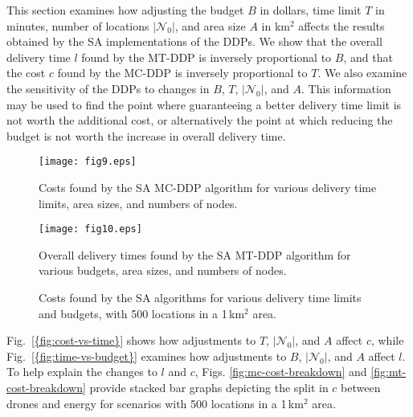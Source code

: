 \documentclass[journal]{IEEEtran}
\begin{document}
This section examines how adjusting the budget ${\ensuremath{B}}$ in dollars, time limit ${\ensuremath{T}}$ in minutes, number of locations $|{\ensuremath{{\ensuremath{\mathcal{N}}}_{0}}}{}|$, and area size ${\ensuremath{A}}$ in km$^2$ affects the results obtained by the SA implementations of the DDPs. We show that the overall delivery time ${\ensuremath{l}}$ found by the MT-DDP is inversely proportional to ${\ensuremath{B}}$, and that the cost ${\ensuremath{c}}$ found by the MC-DDP is inversely proportional to ${\ensuremath{T}}$. We also examine the sensitivity of the DDPs to changes in ${\ensuremath{B}}$, ${\ensuremath{T}}$, $|{\ensuremath{{\ensuremath{\mathcal{N}}}_{0}}}{}|$, and ${\ensuremath{A}}$. This information may be used to find the point where guaranteeing a better delivery time limit is not worth the additional cost, or alternatively the point at which reducing the budget is not worth the increase in overall delivery time.

\begin{figure}[t!]
\centering
\texttt{[image: fig9.eps]}
\caption{Costs found by the SA MC-DDP algorithm for various delivery time limits, area sizes, and numbers of nodes.}
\label{fig:cost-vs-time}
\end{figure}

\begin{figure}[t!]
\centering
\texttt{[image: fig10.eps]}
\caption{Overall delivery times found by the SA MT-DDP algorithm for various budgets, area sizes, and numbers of nodes.}
\label{fig:time-vs-budget}
\end{figure}

\begin{figure}[t!]
\centering
{}
\caption{Costs found by the SA algorithms for various delivery time limits and budgets, with 500 locations in a 1\,km$^2$ area.}
\label{fig:cost-breakdown}
\end{figure}

{Fig.~\ref{{fig:cost-vs-time}}} shows how adjustments to ${\ensuremath{T}}$, $|{\ensuremath{{\ensuremath{\mathcal{N}}}_{0}}}{}|$, and ${\ensuremath{A}}$ affect ${\ensuremath{c}}$, while {Fig.~\ref{{fig:time-vs-budget}}} examines how adjustments to ${\ensuremath{B}}$, $|{\ensuremath{{\ensuremath{\mathcal{N}}}_{0}}}{}|$, and ${\ensuremath{A}}$ affect ${\ensuremath{l}}$. To help explain the changes to ${\ensuremath{l}}$ and ${\ensuremath{c}}$, Figs. \ref{fig:mc-cost-breakdown} and \ref{fig:mt-cost-breakdown} provide stacked bar graphs depicting the split in ${\ensuremath{c}}$ between drones and energy for scenarios with 500 locations in a 1\,km$^2$ area.
\end{document}
